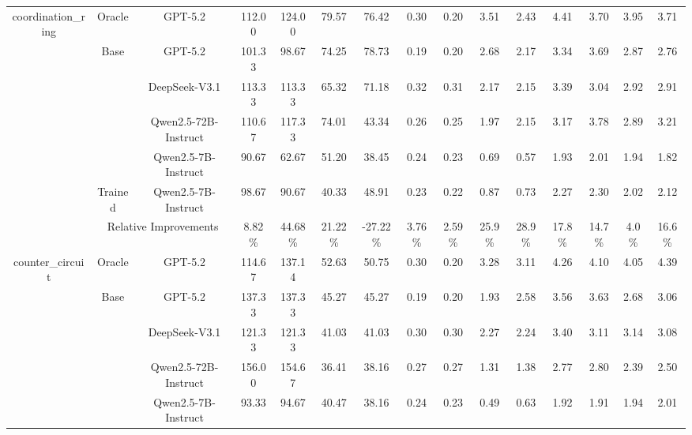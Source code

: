 \documentclass{article}
\theoremstyle{plain}
\theoremstyle{definition}
\theoremstyle{remark}
\begin{document}
\begin{table}[htbp]
{\begin{tabular}{c|c|r|cccccc|cccccc}
      \midrule
      \multirow{7}[8]{*}{coordination\_ring} & Oracle & \multicolumn{1}{c|}{GPT-5.2} & 112.00  & 124.00  & 79.57  & 76.42  & 0.30  & 0.20  & 3.51  & 2.43  & 4.41  & 3.70  & 3.95  & 3.71  \\
  \cmidrule{2-15}          & \multirow{4}[2]{*}{Base} & \multicolumn{1}{c|}{GPT-5.2} & 101.33  & 98.67  & 74.25  & 78.73  & 0.19  & 0.20  & 2.68  & 2.17  & 3.34  & 3.69  & 2.87  & 2.76  \\
            &       & \multicolumn{1}{c|}{DeepSeek-V3.1} & 113.33  & 113.33  & 65.32  & 71.18  & 0.32  & 0.31  & 2.17  & 2.15  & 3.39  & 3.04  & 2.92  & 2.91  \\
            &       & \multicolumn{1}{c|}{Qwen2.5-72B-Instruct} & 110.67  & 117.33  & 74.01  & 43.34  & 0.26  & 0.25  & 1.97  & 2.15  & 3.17  & 3.78  & 2.89  & 3.21  \\
            &       & \multicolumn{1}{c|}{Qwen2.5-7B-Instruct} & 90.67  & 62.67  & 51.20  & 38.45  & 0.24  & 0.23  & 0.69  & 0.57  & 1.93  & 2.01  & 1.94  & 1.82  \\
  \cmidrule{2-15}          & Trained & \multicolumn{1}{c|}{Qwen2.5-7B-Instruct} & 98.67  & 90.67  & 40.33  & 48.91  & 0.23  & 0.22  & 0.87  & 0.73  & 2.27  & 2.30  & 2.02  & 2.12  \\
  \cmidrule{2-15}          & \multicolumn{2}{c|}{Relative Improvements} & 8.82\% & 44.68\% & 21.22\% & -27.22\% & 3.76\% & 2.59\% & 25.9\% & 28.9\% & 17.8\% & 14.7\% & 4.0\% & 16.6\% \\
      \midrule
      \multirow{7}[8]{*}{counter\_circuit} & Oracle & \multicolumn{1}{c|}{GPT-5.2} & 114.67  & 137.14  & 52.63  & 50.75  & 0.30  & 0.20  & 3.28  & 3.11  & 4.26  & 4.10  & 4.05  & 4.39  \\
  \cmidrule{2-15}          & \multirow{4}[2]{*}{Base} & \multicolumn{1}{c|}{GPT-5.2} & 137.33  & 137.33  & 45.27  & 45.27  & 0.19  & 0.20  & 1.93  & 2.58  & 3.56  & 3.63  & 2.68  & 3.06  \\
            &       & \multicolumn{1}{c|}{DeepSeek-V3.1} & 121.33  & 121.33  & 41.03  & 41.03  & 0.30  & 0.30  & 2.27  & 2.24  & 3.40  & 3.11  & 3.14  & 3.08  \\
            &       & \multicolumn{1}{c|}{Qwen2.5-72B-Instruct} & 156.00  & 154.67  & 36.41  & 38.16  & 0.27  & 0.27  & 1.31  & 1.38  & 2.77  & 2.80  & 2.39  & 2.50  \\
            &       & \multicolumn{1}{c|}{Qwen2.5-7B-Instruct} & 93.33  & 94.67  & 40.47  & 38.16  & 0.24  & 0.23  & 0.49  & 0.63  & 1.92  & 1.91  & 1.94  & 2.01  \\

\end{tabular}}
\end{table}
\end{document}
